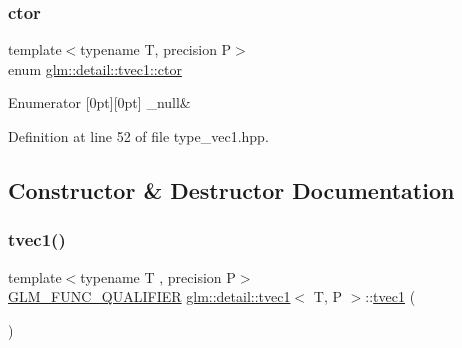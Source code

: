 \subsubsection{\texorpdfstring{ctor}{ctor}}
{\footnotesize\ttfamily template$<$typename T, precision P$>$ \\
enum \hyperlink{structglm_1_1detail_1_1tvec1_a33f1783ca537d8dad5624e5adcf6bd5a}{glm\+::detail\+::tvec1\+::ctor}}

\begin{DoxyEnumFields}{Enumerator}
[0pt][0pt]{}\mbox{\label{structglm_1_1detail_1_1tvec1_a33f1783ca537d8dad5624e5adcf6bd5aa7ce00dc90fccdedc1198d857fa60e844}} 
\+\_\+null&\\
\hline

\end{DoxyEnumFields}


Definition at line 52 of file type\+\_\+vec1.\+hpp.



\subsection{Constructor \& Destructor Documentation}
\mbox{\label{structglm_1_1detail_1_1tvec1_aa5c5b819c38630370d7cadd0a578709e}} 
\subsubsection{\texorpdfstring{tvec1()}{tvec1()}\hspace{0.1cm}{\footnotesize\ttfamily [1/14]}}
{\footnotesize\ttfamily template$<$typename T , precision P$>$ \\
\hyperlink{setup_8hpp_a33fdea6f91c5f834105f7415e2a64407}{G\+L\+M\+\_\+\+F\+U\+N\+C\+\_\+\+Q\+U\+A\+L\+I\+F\+I\+ER} \hyperlink{structglm_1_1detail_1_1tvec1}{glm\+::detail\+::tvec1}$<$ T, P $>$\+::\hyperlink{structglm_1_1detail_1_1tvec1}{tvec1} (\begin{DoxyParamCaption}{ }\end{DoxyParamCaption})}



